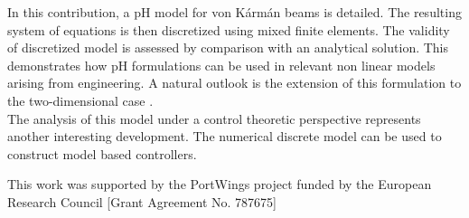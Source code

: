 \documentclass{ifacconf}
\begin{document}
In this contribution, a pH model for von K\'arm\'an beams is detailed. The resulting system of equations is then discretized using mixed finite elements. The validity of discretized model is assessed by comparison with an analytical solution. This demonstrates how pH formulations can be used in relevant non linear models arising from engineering. A natural outlook is the extension of this formulation to the two-dimensional case \cite{brugnoli2021enoc}. \\

The analysis of this model under a control theoretic perspective represents another interesting development. The numerical discrete model can be used to construct model based controllers.

\begin{ack}
	This work was supported by the PortWings project funded
	by the European Research Council [Grant Agreement No. 787675]
\end{ack}

\appendix

      
\end{document}
